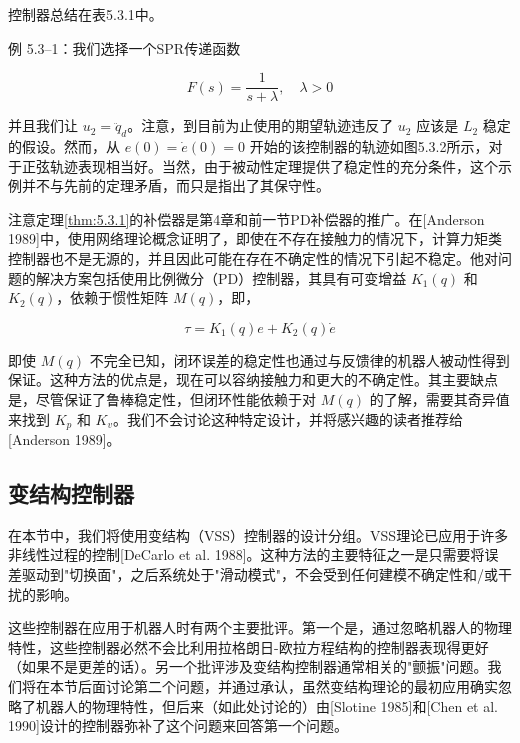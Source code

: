 \documentclass[UTF8,12pt,a4paper]{ctexart}
\begin{document}
控制器总结在表5.3.1中。

\begin{example}[无源控制器]
例 5.3--1：我们选择一个SPR传递函数

\begin{equation}
F(s) = \frac{1}{s + \lambda}, \quad \lambda > 0
\end{equation}

并且我们让 $u_2 = \ddot{q}_d$。注意，到目前为止使用的期望轨迹违反了 $u_2$ 应该是 $L_2$ 稳定的假设。然而，从 $e(0) = \dot{e}(0) = 0$ 开始的该控制器的轨迹如图5.3.2所示，对于正弦轨迹表现相当好。当然，由于被动性定理提供了稳定性的充分条件，这个示例并不与先前的定理矛盾，而只是指出了其保守性。
\end{example}

注意定理\ref{thm:5.3.1}的补偿器是第4章和前一节PD补偿器的推广。在[Anderson 1989]中，使用网络理论概念证明了，即使在不存在接触力的情况下，计算力矩类控制器也不是无源的，并且因此可能在存在不确定性的情况下引起不稳定。他对问题的解决方案包括使用比例微分（PD）控制器，其具有可变增益 $K_1(q)$ 和 $K_2(q)$，依赖于惯性矩阵 $M(q)$，即，

\begin{equation}\label{eq:5.3.3}
\tau = K_1(q)e + K_2(q)\dot{e}
\end{equation}

即使 $M(q)$ 不完全已知，闭环误差的稳定性也通过与反馈律的机器人被动性得到保证。这种方法的优点是，现在可以容纳接触力和更大的不确定性。其主要缺点是，尽管保证了鲁棒稳定性，但闭环性能依赖于对 $M(q)$ 的了解，需要其奇异值来找到 $K_p$ 和 $K_v$。我们不会讨论这种特定设计，并将感兴趣的读者推荐给[Anderson 1989]。

\subsection{变结构控制器}

在本节中，我们将使用变结构（VSS）控制器的设计分组。VSS理论已应用于许多非线性过程的控制[DeCarlo et al. 1988]。这种方法的主要特征之一是只需要将误差驱动到"切换面"，之后系统处于"滑动模式"，不会受到任何建模不确定性和/或干扰的影响。

这些控制器在应用于机器人时有两个主要批评。第一个是，通过忽略机器人的物理特性，这些控制器必然不会比利用拉格朗日-欧拉方程结构的控制器表现得更好（如果不是更差的话）。另一个批评涉及变结构控制器通常相关的"颤振"问题。我们将在本节后面讨论第二个问题，并通过承认，虽然变结构理论的最初应用确实忽略了机器人的物理特性，但后来（如此处讨论的）由[Slotine 1985]和[Chen et al. 1990]设计的控制器弥补了这个问题来回答第一个问题。
\end{document}
